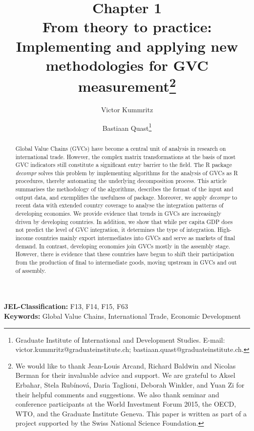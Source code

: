 \documentclass[a4paper,11pt]{article}
\begin{document}
\title{{\vspace{-2cm}
\Huge \textbf{Chapter 1}}\\ From theory to practice: Implementing and applying new methodologies for GVC measurement\footnote{We would like to thank Jean-Louis Arcand, Richard Baldwin and Nicolas Berman for their invaluable advice and support. We are grateful to Aksel Erbahar, Stela Rub\'inov\'a, Daria Taglioni, Deborah Winkler, and Yuan Zi for their helpful comments and suggestions. We also thank seminar and conference participants at the World Investment Forum 2015, the OECD, WTO, and the Graduate Institute Geneva. This paper is written as part of a project supported by the Swiss National Science Foundation.}}
\author{Victor Kummritz\footnotemark[2] \and Bastiaan Quast\footnotemark[2]\thanks{Graduate Institute of International and Development Studies. E-mail: victor.kummritz@graduateinstitute.ch; bastiaan.quast@graduateinstitute.ch.}}

\maketitle

\begin{abstract}
\begin{singlespace}
\noindent Global Value Chains (GVCs) have become a central unit of analysis in research on
international trade. However, the complex matrix transformations at the basis of most
GVC indicators still constitute a significant entry barrier to the field. The R
package \emph{decompr} solves this problem by implementing algorithms for the analysis of GVCs as R procedures, thereby automating the underlying decomposition process. This article summarises the methodology of the algorithms, describes the format of the input and output data, and exemplifies the usefulness of package. Moreover, we apply \emph{decompr} to recent data with extended country coverage to analyse the integration patterns of developing economies. We provide evidence that trends in GVCs are increasingly driven by developing countries. In addition, we show that while per capita GDP does not predict the level of GVC integration, it determines the type of integration. High-income countries mainly export intermediates into GVCs and serve as markets of final demand. In contrast, developing economies join GVCs mostly in the assembly stage. However, there is evidence that these countries have begun to shift their participation from the production of final to intermediate goods, moving upstream in GVCs and out of assembly.
\end{singlespace}
\end{abstract}
\noindent
{\bf JEL-Classification:} F13, F14, F15, F63\\
{\bf Keywords:} Global Value Chains, International Trade, Economic Development
\end{document}
